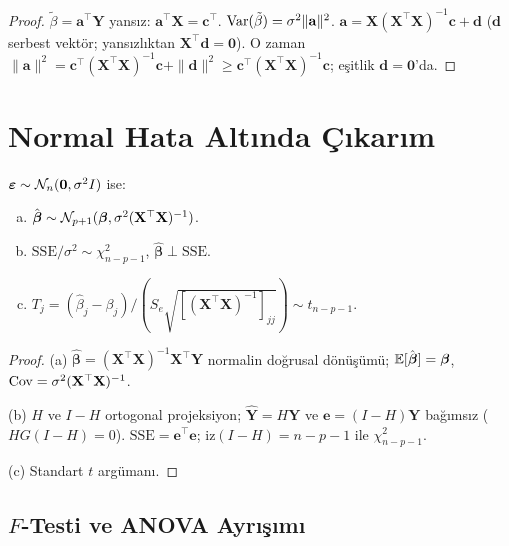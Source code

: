 \begin{proof}
$\tilde{\beta} = \mathbf{a}^\top\mathbf{Y}$ yansız: $\mathbf{a}^\top\mathbf{X}=\mathbf{c}^\top$. $\operatorname{Var}(\tilde\beta)=\sigma^2\|\mathbf{a}\|^2$. $\mathbf{a}=\mathbf{X}(\mathbf{X}^\top\mathbf{X})^{-1}\mathbf{c}+\mathbf{d}$ ($\mathbf{d}$ serbest vektör; yansızlıktan $\mathbf{X}^\top\mathbf{d}=\mathbf{0}$). O zaman $\|\mathbf{a}\|^2=\mathbf{c}^\top(\mathbf{X}^\top\mathbf{X})^{-1}\mathbf{c}+\|\mathbf{d}\|^2\geq\mathbf{c}^\top(\mathbf{X}^\top\mathbf{X})^{-1}\mathbf{c}$; eşitlik $\mathbf{d}=\mathbf{0}$'da.
\end{proof}

\section{Normal Hata Altında Çıkarım}
\label{sec:normal_cikarim}

\begin{teorem}\label{thm:normal_regresyon_dag}
$\boldsymbol{\varepsilon}\sim\mathcal{N}_n(\mathbf{0},\sigma^2 I)$ ise:
\begin{enumerate}[(a)]
  \item $\hat{\boldsymbol{\beta}}\sim\mathcal{N}_{p+1}(\boldsymbol{\beta},\sigma^2(\mathbf{X}^\top\mathbf{X})^{-1})$.
  \item $\mathrm{SSE}/\sigma^2\sim\chi^2_{n-p-1}$, $\hat{\boldsymbol{\beta}}\perp\mathrm{SSE}$.
  \item $T_j = (\hat\beta_j-\beta_j)/(S_e\sqrt{[(\mathbf{X}^\top\mathbf{X})^{-1}]_{jj}})\sim t_{n-p-1}$.
\end{enumerate}
\end{teorem}

\begin{proof}
(a) $\hat{\boldsymbol{\beta}}=(\mathbf{X}^\top\mathbf{X})^{-1}\mathbf{X}^\top\mathbf{Y}$ normalin doğrusal dönüşümü; $\mathbb{E}[\hat{\boldsymbol{\beta}}]=\boldsymbol{\beta}$, $\operatorname{Cov}=\sigma^2(\mathbf{X}^\top\mathbf{X})^{-1}$.

(b) $H$ ve $I-H$ ortogonal projeksiyon; $\hat{\mathbf{Y}}=H\mathbf{Y}$ ve $\mathbf{e}=(I-H)\mathbf{Y}$ bağımsız ($HG(I-H)=0$). $\mathrm{SSE}=\mathbf{e}^\top\mathbf{e}$; iz$(I-H)=n-p-1$ ile $\chi^2_{n-p-1}$.

(c) Standart $t$ argümanı.
\end{proof}

\subsection{$F$-Testi ve ANOVA Ayrışımı}

